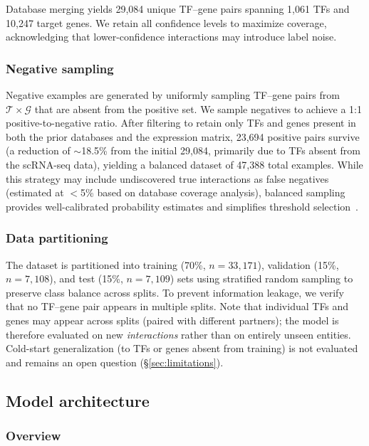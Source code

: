 \documentclass[10pt,twocolumn]{article}
\begin{document}
Database merging yields 29,084 unique TF--gene pairs spanning 1,061 TFs and 10,247 target genes.
We retain all confidence levels to maximize coverage, acknowledging that lower-confidence interactions may introduce label noise.

\subsubsection{Negative sampling}
\label{sec:negative}

Negative examples are generated by uniformly sampling TF--gene pairs from $\mathcal{T} \times \mathcal{G}$ that are absent from the positive set.
We sample negatives to achieve a 1:1 positive-to-negative ratio.
After filtering to retain only TFs and genes present in both the prior databases and the expression matrix, 23{,}694 positive pairs survive (a reduction of ${\sim}$18.5\% from the initial 29{,}084, primarily due to TFs absent from the scRNA-seq data), yielding a balanced dataset of 47{,}388 total examples.
While this strategy may include undiscovered true interactions as false negatives (estimated at $<$5\% based on database coverage analysis), balanced sampling provides well-calibrated probability estimates and simplifies threshold selection~\cite{he2009learning}.

\subsubsection{Data partitioning}
\label{sec:split}

The dataset is partitioned into training (70\%, $n = 33{,}171$), validation (15\%, $n = 7{,}108$), and test (15\%, $n = 7{,}109$) sets using stratified random sampling to preserve class balance across splits.
To prevent information leakage, we verify that no TF--gene pair appears in multiple splits.
Note that individual TFs and genes may appear across splits (paired with different partners); the model is therefore evaluated on new \textit{interactions} rather than on entirely unseen entities.
Cold-start generalization (to TFs or genes absent from training) is not evaluated and remains an open question (\S\ref{sec:limitations}).

\subsection{Model architecture}
\label{sec:architecture}

\subsubsection{Overview}
\end{document}
